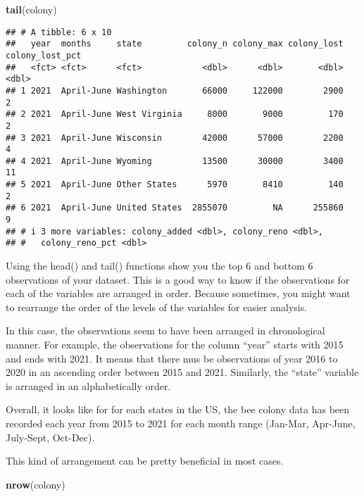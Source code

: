 \documentclass[
]{article}
\newenvironment{Shaded}{\begin{snugshade}}{\end{snugshade}}
\newcommand{\FunctionTok}[1]{\textcolor[rgb]{0.13,0.29,0.53}{\textbf{#1}}}
\newcommand{\NormalTok}[1]{#1}
\begin{document}
\begin{Shaded}
\begin{Highlighting}[]
\FunctionTok{tail}\NormalTok{(colony)}
\end{Highlighting}
\end{Shaded}

\begin{verbatim}
## # A tibble: 6 x 10
##   year  months     state         colony_n colony_max colony_lost colony_lost_pct
##   <fct> <fct>      <fct>            <dbl>      <dbl>       <dbl>           <dbl>
## 1 2021  April-June Washington       66000     122000        2900               2
## 2 2021  April-June West Virginia     8000       9000         170               2
## 3 2021  April-June Wisconsin        42000      57000        2200               4
## 4 2021  April-June Wyoming          13500      30000        3400              11
## 5 2021  April-June Other States      5970       8410         140               2
## 6 2021  April-June United States  2855070         NA      255860               9
## # i 3 more variables: colony_added <dbl>, colony_reno <dbl>,
## #   colony_reno_pct <dbl>
\end{verbatim}

Using the head() and tail() functions show you the top 6 and bottom 6
observations of your dataset. This is a good way to know if the
observations for each of the variables are arranged in order. Because
sometimes, you might want to rearrange the order of the levels of the
variables for easier analysis.

In this case, the observations seem to have been arranged in
chronological manner. For example, the observations for the column
``year'' starts with 2015 and ends with 2021. It means that there mus be
observations of year 2016 to 2020 in an ascending order between 2015 and
2021. Similarly, the ``state'' variable is arranged in an alphabetically
order.

Overall, it looks like for for each states in the US, the bee colony
data has been recorded each year from 2015 to 2021 for each month range
(Jan-Mar, Apr-June, July-Sept, Oct-Dec).

This kind of arrangement can be pretty beneficial in most cases.

\begin{Shaded}
\begin{Highlighting}[]
\FunctionTok{nrow}\NormalTok{(colony)}
\end{Highlighting}
\end{Shaded}
\end{document}
